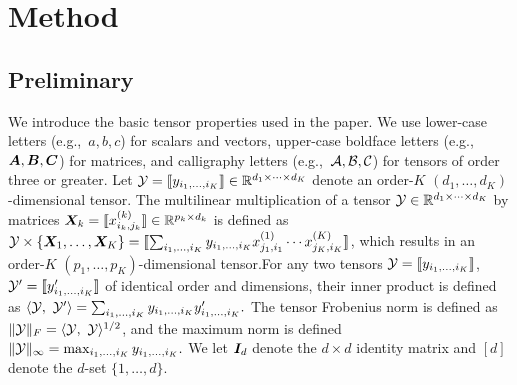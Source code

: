 \documentclass{article}
\theoremstyle{definition}
\theoremstyle{definition}
\begin{document}
  
\vspace{-0.3cm}

\section{Method}

\subsection{Preliminary}
We introduce the basic tensor properties used in the paper. We use lower-case letters (e.g.,\ $a,b,c$) for scalars and vectors, upper-case boldface letters (e.g.,\ $\bm A, \bm B, \bm C$) for matrices, and calligraphy letters (e.g.,\ $\mathcal{A}, \mathcal{B}, \mathcal{C}$) for tensors of order three or greater. Let $\mathcal{Y}=\llbracket y_{i_1,\ldots,i_K} \rrbracket\in \mathbb{R}^{d_1\times \cdots\times d_K}$ denote an order-$K$ $(d_1,\ldots,d_K)$-dimensional tensor. The multilinear multiplication of a tensor $\mathcal{Y}\in\mathbb{R}^{d_1\times \cdots\times d_K}$ by matrices $\bm X_k=\llbracket x_{i_k,j_k}^{(k)} \rrbracket\in\mathbb{R}^{p_k\times d_k}$ is defined as $\mathcal{Y}\times\{\bm X_1,\ldots,\bm X_K\} =\llbracket \sum_{i_1,\ldots,i_K}y_{i_1,\ldots,i_K}x_{j_1,i_1}^{(1)}\cdots x_{j_K,i_K}^{(K)} \rrbracket$,
which results in an order-$K$ $(p_1,\ldots,p_K)$-dimensional tensor.For any two tensors $\mathcal{Y}=\llbracket y_{i_1,\ldots,i_K} \rrbracket$, $\mathcal{Y}'=\llbracket y'_{i_1,\ldots,i_K} \rrbracket$ of identical order and dimensions, their inner product is defined as $\langle \mathcal{Y},\ \mathcal{Y}'\rangle =\sum_{i_1,\ldots,i_K}y_{i_1,\ldots,i_K}y'_{i_1,\ldots,i_K}.$
The tensor Frobenius norm is defined as $\lVert\mathcal{Y}\rVert_F=\langle \mathcal{Y},\ \mathcal{Y} \rangle^{1/2}$, and the maximum norm is defined $\lVert\mathcal{Y}\rVert_\infty=\max_{i_1,\ldots,i_K}y_{i_1,\ldots,i_K}.$  We let $\bm I_d$ denote the $d \times d$ identity matrix and $[d]$ denote the $d$-set $\{1,\ldots,d\}$.
\end{document}
